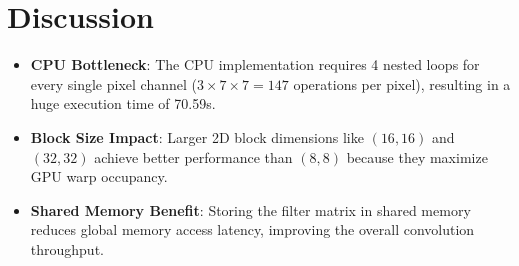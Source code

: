 \documentclass{article}
\begin{document}
\section{Discussion}
\begin{itemize}
    \item \textbf{CPU Bottleneck}: The CPU implementation requires 4 nested loops for every single pixel channel ($3 \times 7 \times 7 = 147$ operations per pixel), resulting in a huge execution time of 70.59s.
    \item \textbf{Block Size Impact}: Larger 2D block dimensions like $(16, 16)$ and $(32, 32)$ achieve better performance than $(8, 8)$ because they maximize GPU warp occupancy.
    \item \textbf{Shared Memory Benefit}: Storing the filter matrix in shared memory reduces global memory access latency, improving the overall convolution throughput.
\end{itemize}
\end{document}
